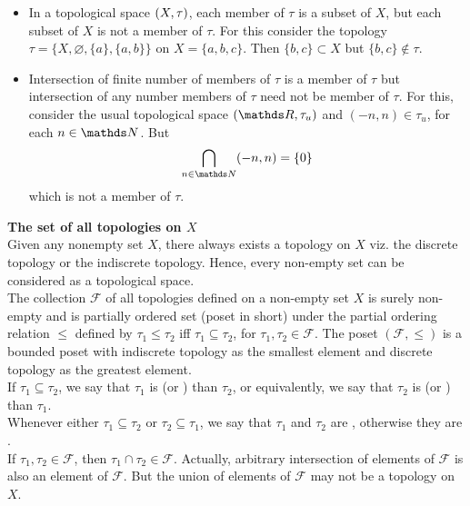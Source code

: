 \documentclass[../main-sheet.tex]{subfiles}
\begin{document}
\begin{rem}
    \hfill
    \begin{itemize}
        \item In a topological space  \((X, \tau)\), each member of  \(\tau\) is a subset of  \(X\), but each subset of  \(X\) is not a member of  \(\tau\). For this consider the topology  \(\tau = \{X, \varnothing, \{a\}, \{a,b\}\}\) on  \(X = \{a,b,c\}\). Then  \(\{b,c\} \subset X\) but  \(\{b,c\} \notin \tau\).
        \item Intersection of finite number of members of  \(\tau\) is a member of  \(\tau\) but intersection of any number members of  \(\tau\) need not be member of  \(\tau\). For this, consider the usual topological space  \((\R, \tau_u)\) and  \((-n, n) \in \tau_u\), for each  \(n \in \N\). But
        \[
            \bigcap_{n\in\N}(-n, n) = \{0\}
        \]
        which is not a member of  \(\tau\).
    \end{itemize}
\end{rem}
\textbf{The set of all topologies on  \(X\)}\\
Given any nonempty set  \(X\), there always exists a topology on  \(X\) viz. the discrete topology or the indiscrete topology. Hence, every non-empty set can be considered as a topological space.\\


The collection  \(\mathscr{F}\) of all topologies defined on a non-empty set  \(X\) is surely non-empty and is partially ordered set (poset in short) under the partial ordering relation  \(\leq \) defined by  \(\tau_1 \leq \tau_2\) iff  \(\tau_1 \subseteq \tau_2\), for  \(\tau_1, \tau_2 \in \mathscr{F}\). The poset  \((\mathscr{F},\leq)\) is a bounded poset with indiscrete topology as the smallest element and discrete topology as the greatest element.\\

If  \(\tau_1\subseteq \tau_2\), we say that  \(\tau_1\) is  (or ) than  \(\tau_2\), or equivalently, we say that  \(\tau_2\) is  (or ) than  \(\tau_1\).\\
Whenever either  \(\tau_1\subseteq\tau_2\) or  \(\tau_2\subseteq\tau_1\), we say that  \(\tau_1\) and  \(\tau_2\) are , otherwise they are .\\


If  \(\tau_1, \tau_2 \in \mathscr{F}\), then  \(\tau_1 \cap \tau_2 \in \mathscr{F}\). Actually, arbitrary intersection of elements of  \(\mathscr{F}\) is also an element of  \(\mathscr{F}\). But the union of elements of  \(\mathscr{F}\) may not be a topology on  \(X\).\\
\end{document}
